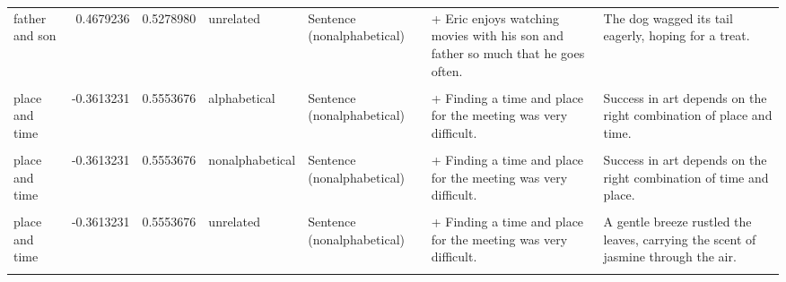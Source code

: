 \documentclass[
  12pt,
]{scrartcl}
\begin{document}
\begin{landscape}
\begin{longtable}{lrrllll}
father and son & 0.4679236 & 0.5278980 & unrelated & Sentence (nonalphabetical) & + Eric enjoys watching movies with his son and father so much that he goes often. & The dog wagged its tail eagerly, hoping for a treat.\\
\cellcolor{gray!6}{place and time} & \cellcolor{gray!6}{-0.3613231} & \cellcolor{gray!6}{0.5553676} & \cellcolor{gray!6}{alphabetical} & \cellcolor{gray!6}{Sentence (alphabetical)} & \cellcolor{gray!6}{+ Finding a place and time for the meeting was very difficult.} & \cellcolor{gray!6}{Success in art depends on the right combination of place and time.}\\
\addlinespace
place and time & -0.3613231 & 0.5553676 & alphabetical & Sentence (nonalphabetical) & + Finding a time and place for the meeting was very difficult. & Success in art depends on the right combination of place and time.\\
\cellcolor{gray!6}{place and time} & \cellcolor{gray!6}{-0.3613231} & \cellcolor{gray!6}{0.5553676} & \cellcolor{gray!6}{nonalphabetical} & \cellcolor{gray!6}{Sentence (alphabetical)} & \cellcolor{gray!6}{+ Finding a place and time for the meeting was very difficult.} & \cellcolor{gray!6}{Success in art depends on the right combination of time and place.}\\
place and time & -0.3613231 & 0.5553676 & nonalphabetical & Sentence (nonalphabetical) & + Finding a time and place for the meeting was very difficult. & Success in art depends on the right combination of time and place.\\
\cellcolor{gray!6}{place and time} & \cellcolor{gray!6}{-0.3613231} & \cellcolor{gray!6}{0.5553676} & \cellcolor{gray!6}{unrelated} & \cellcolor{gray!6}{Sentence (alphabetical)} & \cellcolor{gray!6}{+ Finding a place and time for the meeting was very difficult.} & \cellcolor{gray!6}{A gentle breeze rustled the leaves, carrying the scent of jasmine through the air.}\\
place and time & -0.3613231 & 0.5553676 & unrelated & Sentence (nonalphabetical) & + Finding a time and place for the meeting was very difficult. & A gentle breeze rustled the leaves, carrying the scent of jasmine through the air.\\
\addlinespace
\cellcolor{gray!6}{arts and sciences} & \cellcolor{gray!6}{0.4544575} & \cellcolor{gray!6}{0.4933751} & \cellcolor{gray!6}{alphabetical} & \cellcolor{gray!6}{Sentence (alphabetical)} & \cellcolor{gray!6}{+ Jessica couldn't decide between studying arts and sciences at her time in college.} & \cellcolor{gray!6}{A well-rounded education often includes a balance of arts and sciences.}\\

\end{longtable}
\end{landscape}
\end{document}
